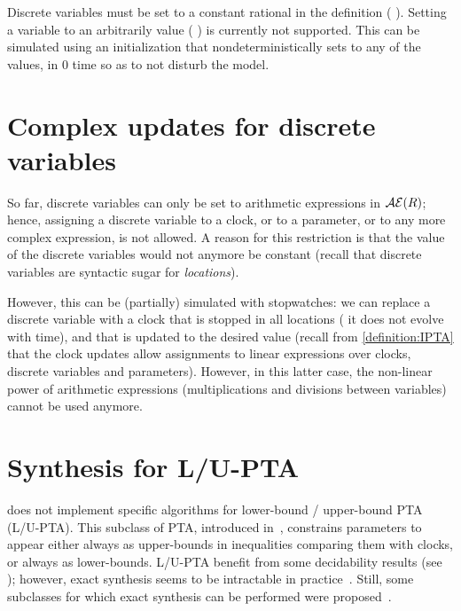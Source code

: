 Discrete variables must be set to a constant rational in the  definition (\eg{} ).
Setting a variable to an arbitrarily value (\eg{} ) is currently not supported.
This can be simulated using an initialization \IPTA{} that nondeterministically sets  to any of the values, in 0 time so as to not disturb the model.


\section{Complex updates for discrete variables}

So far, discrete variables can only be set to arithmetic expressions in $\mathcal{AE}(R)$;
hence, assigning a discrete variable to a clock, or to a parameter, or to any more complex expression, is not allowed.
A reason for this restriction is that the value of the discrete variables would not anymore be constant (recall that discrete variables are syntactic sugar for \emph{locations}).

However, this can be (partially) simulated with stopwatches: we can replace a discrete variable with a clock that is stopped in all locations (\ie{} it does not evolve with time), and that is updated to the desired value (recall from \cref{definition:IPTA} that the clock updates allow assignments to linear expressions over clocks, discrete variables and parameters).
However, in this latter case, the non-linear power of arithmetic expressions (multiplications and divisions between variables) cannot be used anymore.



\section{Synthesis for L/U-PTA}

\imitator{} does not implement specific algorithms for lower-bound / upper-bound PTA (L/U-PTA).
This subclass of PTA, introduced in~\cite{HRSV02}, constrains parameters to appear either always as upper-bounds in inequalities comparing them with clocks, or always as lower-bounds.
L/U-PTA benefit from some decidability results (see \eg{} \cite{HRSV02,BlT09,JLR15,ALime17,ALM20}); however, exact synthesis seems to be intractable in practice~\cite{JLR15,ALR16ICFEM}.
Still, some subclasses for which exact synthesis can be performed were proposed~\cite{BlT09,ALR18FORMATS}.

